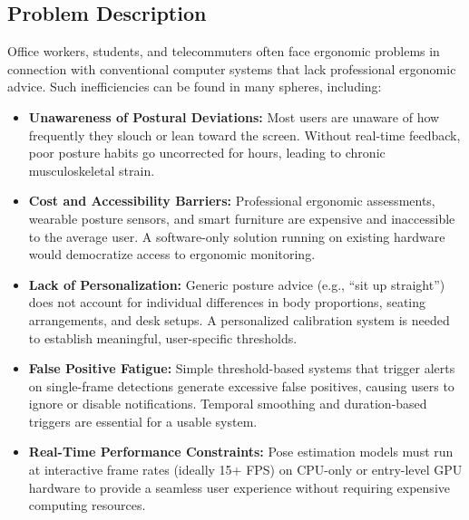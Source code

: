 \documentclass{llncs}
\begin{document}
\subsection{Problem Description}
Office workers, students, and telecommuters often face ergonomic problems in connection with conventional computer systems that lack professional ergonomic advice. Such inefficiencies can be found in many spheres, including:
\begin{itemize}
    \item \textbf{Unawareness of Postural Deviations:} Most users are unaware of how frequently they slouch or lean toward the screen. Without real-time feedback, poor posture habits go uncorrected for hours, leading to chronic musculoskeletal strain.
    \item \textbf{Cost and Accessibility Barriers:} Professional ergonomic assessments, wearable posture sensors, and smart furniture are expensive and inaccessible to the average user. A software-only solution running on existing hardware would democratize access to ergonomic monitoring.
    \item \textbf{Lack of Personalization:} Generic posture advice (e.g., ``sit up straight'') does not account for individual differences in body proportions, seating arrangements, and desk setups. A personalized calibration system is needed to establish meaningful, user-specific thresholds.
    \item \textbf{False Positive Fatigue:} Simple threshold-based systems that trigger alerts on single-frame detections generate excessive false positives, causing users to ignore or disable notifications. Temporal smoothing and duration-based triggers are essential for a usable system.
    \item \textbf{Real-Time Performance Constraints:} Pose estimation models must run at interactive frame rates (ideally 15+ FPS) on CPU-only or entry-level GPU hardware to provide a seamless user experience without requiring expensive computing resources.
\end{itemize}
\end{document}
